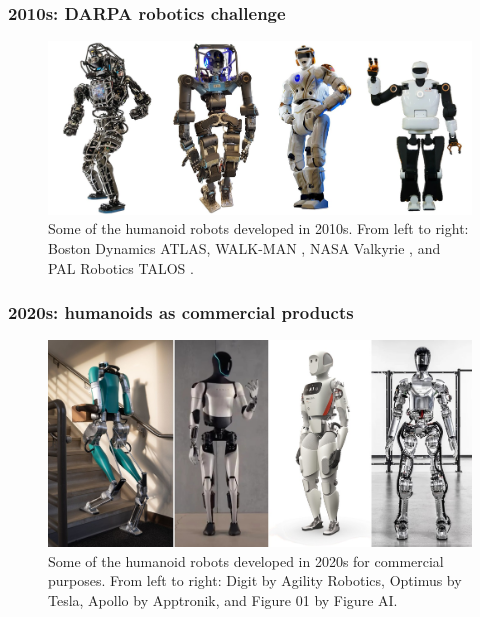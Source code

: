 \subsubsection{2010s: DARPA robotics challenge}
\begin{figure}
    \centering
    \includegraphics[width=\textwidth]{figures/01-introduction/robots-in-2010.jpg}
    \caption{Some of the humanoid robots developed in 2010s. From left to right:
        Boston Dynamics ATLAS,
        WALK-MAN \cite{Tsagarakis2017WALKMAN},
        NASA Valkyrie \cite{Radford2015Valkyrie}, and
        PAL Robotics TALOS \cite{Stasse2017TALOS}.}
    \label{fig:introduction:robots-in-2010}
\end{figure}

\subsubsection{2020s: humanoids as commercial products}
\begin{figure}
    \centering
    \includegraphics[width=\textwidth]{figures/01-introduction/robots-in-2020.jpg}
    \caption{Some of the humanoid robots developed in 2020s for commercial
        purposes. From left to right:
        Digit by Agility Robotics, Optimus by Tesla, Apollo by Apptronik, and
        Figure 01 by Figure AI.
    }
    \label{fig:introduction:robots-in-2020}
\end{figure}

